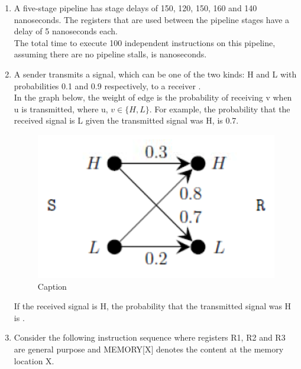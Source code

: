 \documentclass[a4paper, 11pt]{article}
\begin{document}
\begin{enumerate}
    \item A five-stage pipeline has stage delays of 150, 120, 150, 160 and 140 nanoseconds. The registers that are used between the pipeline stages have a delay of 5 nanoseconds each.\\The total time to execute 100 independent instructions on this pipeline, assuming there are no pipeline stalls, is \underline{\hspace{2cm}} nanoseconds.
    \hfill{}
    
    \item A sender  transmits a signal, which can be one of the two kinds: H and L with probabilities 0.1 and 0.9 respectively, to a receiver .\\In the graph below, the weight of edge  is the probability of receiving v when u is transmitted, where u, $v \in \{H,L\}$. For example, the probability that the received signal is L given the transmitted signal was H, is 0.7.
    \begin{figure}[H]
        \centering
        \includegraphics[width=0.5\columnwidth]{figs/q64.png}
        \caption{Caption}
        \label{fig:placeholder}
    \end{figure}
    If the received signal is H, the probability that the transmitted signal was H  is \underline{\hspace{2cm}}.
    
    \hfill{}
    
    \item Consider the following instruction sequence where registers R1, R2 and R3 are general purpose and MEMORY[X] denotes the content at the memory location X.
    

\end{enumerate}
\end{document}
